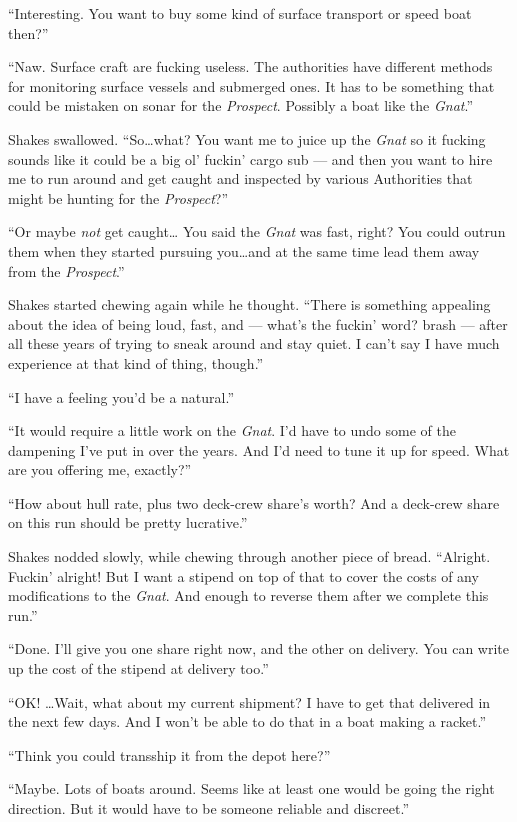 \documentclass[
]{scrbook}
\begin{document}
``Interesting. You want to buy some kind of surface transport or speed
boat then?''

``Naw. Surface craft are fucking useless. The authorities have different
methods for monitoring surface vessels and submerged ones. It has to be
something that could be mistaken on sonar for the \emph{Prospect}.
Possibly a boat like the \emph{Gnat}.''

Shakes swallowed. ``So\ldots what? You want me to juice up the
\emph{Gnat} so it fucking sounds like it could be a big ol' fuckin'
cargo sub --- and then you want to hire me to run around and get caught
and inspected by various Authorities that might be hunting for the
\emph{Prospect}?''

``Or maybe \emph{not} get caught\ldots{} You said the \emph{Gnat} was
fast, right? You could outrun them when they started pursuing
you\ldots and at the same time lead them away from the
\emph{Prospect}.''

Shakes started chewing again while he thought. ``There is something
appealing about the idea of being loud, fast, and --- what's the fuckin'
word? brash --- after all these years of trying to sneak around and stay
quiet. I can't say I have much experience at that kind of thing,
though.''

``I have a feeling you'd be a natural.''

``It would require a little work on the \emph{Gnat}. I'd have to undo
some of the dampening I've put in over the years. And I'd need to tune
it up for speed. What are you offering me, exactly?''

``How about hull rate, plus two deck-crew share's worth? And a deck-crew
share on this run should be pretty lucrative.''

Shakes nodded slowly, while chewing through another piece of bread.
``Alright. Fuckin' alright! But I want a stipend on top of that to cover
the costs of any modifications to the \emph{Gnat}. And enough to reverse
them after we complete this run.''

``Done. I'll give you one share right now, and the other on delivery.
You can write up the cost of the stipend at delivery too.''

``OK! \ldots Wait, what about my current shipment? I have to get that
delivered in the next few days. And I won't be able to do that in a boat
making a racket.''

``Think you could transship it from the depot here?''

``Maybe. Lots of boats around. Seems like at least one would be going
the right direction. But it would have to be someone reliable and
discreet.''
\end{document}
